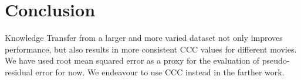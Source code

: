 \documentclass{article}
\begin{document}
\section{Conclusion}
Knowledge Transfer from a larger and more varied dataset not only improves performance, but also results in more consistent CCC values for different movies. We have used root mean squared error as a proxy for the evaluation of pseudo-residual error for now. We endeavour to use CCC instead in the farther work. 

\footnotesize{
\begin{spacing}{.85 }


\end{spacing}
}
\end{document}
